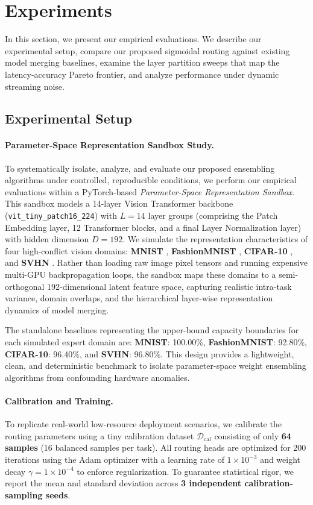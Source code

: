 \section{Experiments}
\label{sec:experiments}

In this section, we present our empirical evaluations. We describe our experimental setup, compare our proposed sigmoidal routing against existing model merging baselines, examine the layer partition sweeps that map the latency-accuracy Pareto frontier, and analyze performance under dynamic streaming noise.

\subsection{Experimental Setup}
\paragraph{Parameter-Space Representation Sandbox Study.}
To systematically isolate, analyze, and evaluate our proposed ensembling algorithms under controlled, reproducible conditions, we perform our empirical evaluations within a PyTorch-based \emph{Parameter-Space Representation Sandbox}. This sandbox models a 14-layer Vision Transformer backbone (\texttt{vit\_tiny\_patch16\_224}) with $L=14$ layer groups (comprising the Patch Embedding layer, 12 Transformer blocks, and a final Layer Normalization layer) with hidden dimension $D=192$. We simulate the representation characteristics of four high-conflict vision domains: \textbf{MNIST} \cite{lecun1998gradient}, \textbf{FashionMNIST} \cite{xiao2017fashion}, \textbf{CIFAR-10} \cite{krizhevsky2009learning}, and \textbf{SVHN} \cite{netzer2011reading}. Rather than loading raw image pixel tensors and running expensive multi-GPU backpropagation loops, the sandbox maps these domains to a semi-orthogonal 192-dimensional latent feature space, capturing realistic intra-task variance, domain overlaps, and the hierarchical layer-wise representation dynamics of model merging. 

The standalone baselines representing the upper-bound capacity boundaries for each simulated expert domain are: \textbf{MNIST}: 100.00\%, \textbf{FashionMNIST}: 92.80\%, \textbf{CIFAR-10}: 96.40\%, and \textbf{SVHN}: 96.80\%. This design provides a lightweight, clean, and deterministic benchmark to isolate parameter-space weight ensembling algorithms from confounding hardware anomalies.

\paragraph{Calibration and Training.}
To replicate real-world low-resource deployment scenarios, we calibrate the routing parameters using a tiny calibration dataset $\mathcal{D}_{\text{cal}}$ consisting of only \textbf{64 samples} (16 balanced samples per task). All routing heads are optimized for 200 iterations using the Adam optimizer \cite{kingma2014adam} with a learning rate of $1 \times 10^{-3}$ and weight decay $\gamma = 1 \times 10^{-4}$ to enforce regularization. To guarantee statistical rigor, we report the mean and standard deviation across \textbf{3 independent calibration-sampling seeds}.


